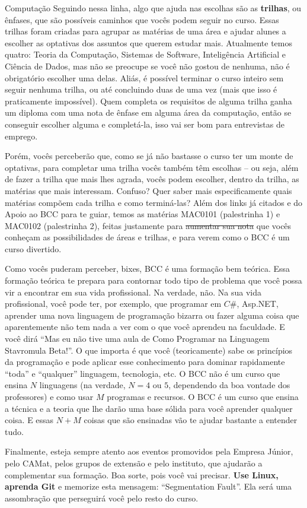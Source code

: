 \begin{subsecao}{Computação}
Seguindo nessa linha, algo que ajuda nas escolhas são as \textbf{trilhas}, ou
ênfases, que são possíveis caminhos que vocês podem seguir no curso. Essas
trilhas foram criadas para agrupar as matérias de uma área e ajudar alunes a
escolher as optativas dos assuntos que querem estudar mais. Atualmente temos
quatro: Teoria da Computação, Sistemas de Software, Inteligência Artificial e
Ciência de Dados, mas não se preocupe se você não gostou de nenhuma, não é
obrigatório escolher uma delas. Aliás, é possível terminar o curso inteiro sem
seguir nenhuma trilha, ou até concluindo duas de uma vez (mais que isso é
praticamente impossível). Quem completa os requisitos de alguma trilha ganha
um diploma com uma nota de ênfase em alguma área da computação, então se
conseguir escolher alguma e completá-la, isso vai ser bom para entrevistas de
emprego.

Porém, vocês perceberão que, como se já não bastasse o curso ter um monte de
optativas, para completar uma trilha vocês também têm escolhas -- ou seja,
além de fazer a trilha que mais lhes agrada, vocês podem escolher, dentro da
trilha, as matérias que mais interessam. Confuso? Quer saber mais
especificamente quais matérias compõem cada trilha e como terminá-las? Além
dos links já citados e do Apoio ao BCC para te guiar, temos as matérias MAC0101
(palestrinha 1) e MAC0102 (palestrinha 2), feitas justamente para
\sout{aumentar sua nota} que vocês conheçam as possibilidades de áreas e
trilhas, e para verem como o BCC é um curso divertido.

Como vocês puderam perceber, bixes, BCC é uma formação bem teórica. Essa
formação teórica te prepara para contornar todo tipo de problema que você
possa vir a encontrar em sua vida profissional. Na verdade, não. Na sua vida
profissional, você pode ter, por exemplo, que programar em $C\#$, Asp.NET,
aprender uma nova linguagem de programação bizarra ou fazer alguma coisa que
aparentemente não tem nada a ver com o que você aprendeu na faculdade. E você
dirá ``Mas eu não tive uma aula de Como Programar na Linguagem Stavromula
Beta!''. O que importa é que você (teoricamente) sabe os princípios da
programação e pode aplicar esse conhecimento para dominar rapidamente ``toda''
e ``qualquer'' linguagem, tecnologia, etc. O BCC não é um curso que ensina $N$
linguagens (na verdade, $N = 4$ ou $5$, dependendo da boa vontade dos
professores) e como usar $M$ programas e recursos. O BCC é um curso que ensina
a técnica e a teoria que lhe darão uma base sólida para você aprender qualquer
coisa. E essas $N + M$ coisas que são ensinadas vão te ajudar bastante a
entender tudo.

Finalmente, esteja sempre atento aos eventos promovidos pela Empresa Júnior,
pelo CAMat, pelos grupos de extensão e pelo instituto, que ajudarão a
complementar sua formação. Boa sorte, pois você vai precisar. \textbf{Use
Linux, aprenda Git} e memorize esta mensagem: ``Segmentation Fault''. Ela será
uma assombração que perseguirá você pelo resto do curso.

\end{subsecao}
